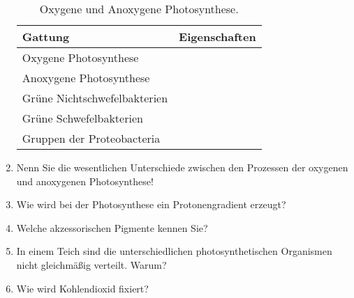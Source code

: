 \begin{enumerate}
		\begin{table}[h!]
		\begin{center}
		\begin{tabular}{l l} 
		\toprule	
		Gattung			&	Eigenschaften 						\\
		\midrule
		\multicolumn{2}{l}{Oxygene Photosynthese}			\\
		\midrule
		\multicolumn{2}{l}{Anoxygene Photosynthese}		\\
		Grüne Nichtschwefelbakterien 	& 	\\
		Grüne Schwefelbakterien			&	\\
		Gruppen der Proteobacteria		&	\\
		\bottomrule
		\end{tabular}
		\caption{Oxygene und Anoxygene Photosynthese.}
		\label{tab:AnOxPs}
		\end{center}
		\end{table}
	
	\item Nenn Sie die wesentlichen Unterschiede zwischen den Prozessen der oxygenen und anoxygenen Photosynthese!
	\item Wie wird bei der Photosynthese ein Protonengradient erzeugt?
	\item Welche akzessorischen Pigmente kennen Sie? 
	\item In einem Teich sind die unterschiedlichen photosynthetischen Organismen nicht gleichmäßig verteilt. Warum?
	\item Wie wird Kohlendioxid fixiert?
\end{enumerate}
